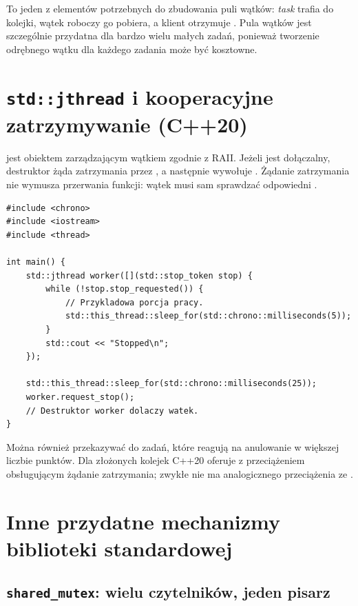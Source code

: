 To jeden z elementów potrzebnych do zbudowania puli wątków:
\emph{task} trafia do kolejki, wątek roboczy go pobiera,
a klient otrzymuje . Pula wątków jest szczególnie
przydatna dla bardzo wielu małych zadań, ponieważ tworzenie
odrębnego wątku dla każdego zadania może być kosztowne.

\section{\texttt{std::jthread} i kooperacyjne zatrzymywanie (C++20)}
\label{sec:jthread}

 jest obiektem zarządzającym wątkiem zgodnie z RAII.
Jeżeli jest dołączalny, destruktor żąda zatrzymania przez
, a następnie wywołuje .
Żądanie zatrzymania nie wymusza przerwania funkcji: wątek musi
sam sprawdzać odpowiedni .

\begin{lstlisting}[caption={Kooperacyjne zatrzymywanie wątku (C++20).}]
#include <chrono>
#include <iostream>
#include <thread>

int main() {
    std::jthread worker([](std::stop_token stop) {
        while (!stop.stop_requested()) {
            // Przykladowa porcja pracy.
            std::this_thread::sleep_for(std::chrono::milliseconds(5));
        }
        std::cout << "Stopped\n";
    });

    std::this_thread::sleep_for(std::chrono::milliseconds(25));
    worker.request_stop();
    // Destruktor worker dolaczy watek.
}
\end{lstlisting}

Można również przekazywać  do zadań, które
reagują na anulowanie w większej liczbie punktów. Dla złożonych
kolejek C++20 oferuje  z przeciążeniem
obsługującym żądanie zatrzymania; zwykłe 
nie ma analogicznego przeciążenia ze .

\section{Inne przydatne mechanizmy biblioteki standardowej}

\subsection{\texttt{shared\_mutex}: wielu czytelników, jeden pisarz}

